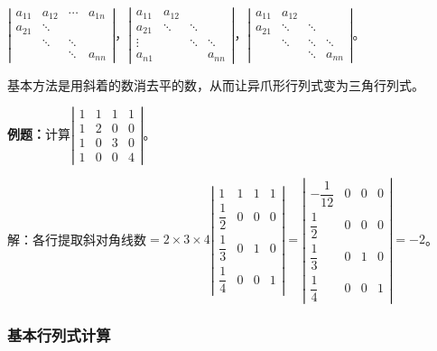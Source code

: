 $\left|\begin{array}{cccc} 
    a_{11} & a_{12} & \cdots & a_{1n} \\
    a_{21} & \ddots & & \\
     & \ddots & \ddots &  \\
     & & \ddots & a_{nn}
\end{array}\right|$，$\left|\begin{array}{cccc} 
    a_{11} & a_{12} & & \\
    a_{21} & \ddots & \ddots & \\
    \vdots & & \ddots & \ddots \\
    a_{n1} & & & a_{nn}
\end{array}\right|$，$\left|\begin{array}{cccc} 
    a_{11} & a_{12} & & \\
    a_{21} & \ddots & \ddots & \\
     & \ddots & \ddots & \ddots \\
     & & \ddots & a_{nn}
\end{array}\right|$。

基本方法是用斜着的数消去平的数，从而让异爪形行列式变为三角行列式。

\textbf{例题：}计算$\left|\begin{array}{cccc} 
    1 & 1 & 1 & 1 \\
    1 & 2 & 0 & 0 \\
    1 & 0 & 3 & 0 \\
    1 & 0 & 0 & 4
\end{array}\right|$。

解：各行提取斜对角线数$=2\times3\times4\left|\begin{array}{cccc} 
    1 & 1 & 1 & 1 \\
    \dfrac{1}{2} & 0 & 0 & 0 \\
    \dfrac{1}{3} & 0 & 1 & 0 \\
    \dfrac{1}{4} & 0 & 0 & 1
\end{array}\right|=\left|\begin{array}{cccc} 
    -\dfrac{1}{12} & 0 & 0 & 0 \\
    \dfrac{1}{2} & 0 & 0 & 0 \\
    \dfrac{1}{3} & 0 & 1 & 0 \\
    \dfrac{1}{4} & 0 & 0 & 1
\end{array}\right|=-2$。

\subsubsection{基本行列式计算}

